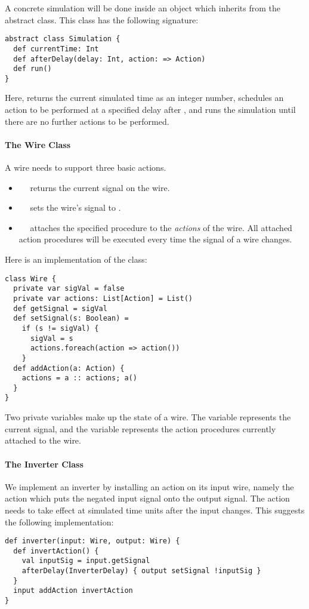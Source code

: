 {A concrete simulation will be done inside an object which inherits
from the abstract  class. This class has the following
signature:

\begin{lstlisting}
abstract class Simulation {
  def currentTime: Int
  def afterDelay(delay: Int, action: => Action)
  def run()
}
\end{lstlisting}
Here,
 returns the current simulated time as an integer
number,
 schedules an action to be performed at a specified
delay after , and
 runs the simulation until there are no further actions to be 
performed.

\paragraph{The Wire Class}
A wire needs to support three basic actions.
\begin{itemize}
\item[]
~~ returns the current signal on the wire.
\item[]
~~ sets the wire's signal to .
\item[]
~~ attaches the specified procedure
 to the {\em actions} of the wire. All attached action
procedures will be executed every time the signal of a wire changes.
\end{itemize}
Here is an implementation of the  class:
\begin{lstlisting}
class Wire {
  private var sigVal = false
  private var actions: List[Action] = List()
  def getSignal = sigVal
  def setSignal(s: Boolean) =
    if (s != sigVal) {
      sigVal = s
      actions.foreach(action => action())
    }
  def addAction(a: Action) {
    actions = a :: actions; a()
  }
}
\end{lstlisting}
Two private variables make up the state of a wire.  The variable
 represents the current signal, and the variable
 represents the action procedures currently attached to
the wire.

\paragraph{The Inverter Class}
We implement an inverter by installing an action on its input wire,
namely the action which puts the negated input signal onto the output
signal.  The action needs to take effect at 
simulated time units after the input changes. This suggests the 
following implementation:
\begin{lstlisting}
def inverter(input: Wire, output: Wire) {
  def invertAction() {
    val inputSig = input.getSignal
    afterDelay(InverterDelay) { output setSignal !inputSig }
  }
  input addAction invertAction
}
\end{lstlisting}

}
